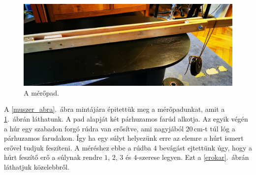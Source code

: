 \documentclass[a4paper,12pt]{article}
\begin{document}
\begin{figure}[h!]
\centering
\includegraphics[width = \linewidth]{elejesullyal.jpg}
\caption{A mérőpad.}
\label{muszer}
\end{figure}

A \ref{muszer_abra}.\ ábra mintájára épitettük meg a mérőpadunkat, amit a \ref{muszer}.\ ábrán láthatunk. A pad alapját két párhuzamos farúd alkotja. Az egyik végén a húr egy szabadon forgó rúdra van erősítve, ami nagyjából $20$\,cm-t túl lóg a párhuzamos farudakon. Így ha egy súlyt helyezünk erre az elemre a húrt ismert erővel tudjuk feszíteni. A méréshez ebbe a rúdba $4$ bevágást ejtettünk úgy, hogy a húrt feszítő erő a súlynak rendre $1$, $2$, $3$ és $4$-szerese legyen. Ezt a \ref{erokar}.\ ábrán láthatjuk közelebbről.
\end{document}

